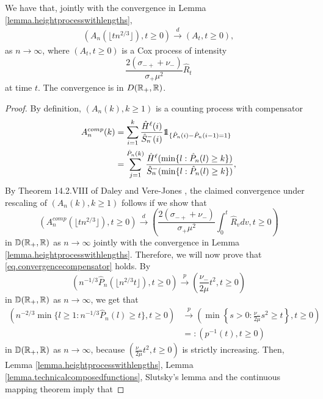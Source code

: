 


\begin{proposition}\label{prop.convergenceancestraledges}
We have that, jointly with the convergence in Lemma \ref{lemma.heightprocesswithlengths},
\begin{align*}\left(A_n\left(\lfloor tn^{2/3}\rfloor\right),t\geq 0\right)\overset{d}{\to}\left(A_t,t\geq 0\right),\end{align*}
as $n\to \infty$, where $(A_t,t\geq 0)$ is a Cox process of intensity $$\frac{2(\sigma_{-+}+\nu_-)}{\sigma_+\mu^2} \hat{R}_t$$ at time $t$. The convergence is in $D({\mathbb R}_+,{\mathbb R})$.
\end{proposition}


\begin{proof}
By definition, $(A_n(k),k\geq 1)$ is a counting process with compensator 
\begin{align*}
    A_n^{comp}(k)&=\sum_{i=1}^k \frac{\hat{H}^\ell(i)}{\hat{S}^-_n(i)}\one_{\{\hat{P}_n(i)-\hat{P}_n(i-1)=1\}}\\
    &=\sum_{j=1}^{\hat{P}_n(k)}\frac{\hat{H}^\ell(\min\{l:\hat{P}_n(l)\geq k\})}{\hat{S}^-_n(\min\{l:\hat{P}_n(l)\geq k\})},
\end{align*}
 By Theorem 14.2.VIII of Daley and Vere-Jones \cite{DaleyVereJones}, the claimed convergence under rescaling of $(A_n(k),k\geq 1)$ follows if we show that 
\begin{equation}\label{eq.convergencecompensator}
    \left(A_n^{comp}\left(\lfloor tn^{2/3}\rfloor \right), t\geq 0\right)\overset{d}{\to}\left(\frac{2(\sigma_{-+}+\nu_-)}{\sigma_+\mu^2} \int_0^t\hat{R}_v dv, t \geq 0\right)
\end{equation}
in ${\mathbb D}({\mathbb R}_+,{\mathbb R})$ as $n\to \infty$ jointly with the convergence in Lemma \ref{lemma.heightprocesswithlengths}. Therefore, we will now prove that \eqref{eq.convergencecompensator} holds. 
By
$$\left(n^{-1/3}\hat{P}_n\left(\lfloor n^{2/3}t\rfloor \right),t\geq 0\right)\overset{p}{\to}\left(\frac{\nu_-}{2\mu}t^2,t\geq 0\right)$$
in ${\mathbb D}({\mathbb R}_+,{\mathbb R})$ as $n\to \infty$,
we get that
\begin{align*}\left(n^{-2/3}\min\{l\geq 1:n^{-1/3}\hat{P}_n(l)\geq t\},t\geq 0\right)&\overset{p}{\to}\left(\min\left\{s>0: \frac{\nu_-}{2\mu}s^2\geq t\right \}, t\geq 0\right)\\
&=:\left(p^{-1}(t),t\geq 0\right) \end{align*}
in ${\mathbb D}({\mathbb R}_+,{\mathbb R})$ as $n\to \infty$, because $\left(\frac{\nu_-}{2\mu}t^2,t\geq 0\right)$ is strictly increasing. Then, Lemma \ref{lemma.heightprocesswithlengths}, Lemma \ref{lemma.technicalcomposedfunctions}, Slutsky's lemma and the continuous mapping theorem imply that 

\end{proof}
